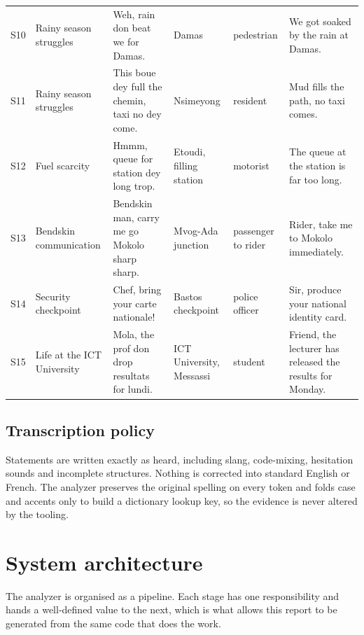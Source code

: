 \documentclass[11pt,a4paper]{article}
\begin{document}
\begin{longtable}{L{0.045} L{0.13} L{0.25} L{0.13} L{0.12} L{0.19}}
S10 & Rainy season struggles & Weh, rain don beat we for Damas. & Damas & pedestrian & We got soaked by the rain at Damas. \\
S11 & Rainy season struggles & This boue dey full the chemin, taxi no dey come. & Nsimeyong & resident & Mud fills the path, no taxi comes. \\
S12 & Fuel scarcity & Hmmm, queue for station dey long trop. & Etoudi, filling station & motorist & The queue at the station is far too long. \\
S13 & Bendskin communication & Bendskin man, carry me go Mokolo sharp sharp. & Mvog-Ada junction & passenger to rider & Rider, take me to Mokolo immediately. \\
S14 & Security checkpoint & Chef, bring your carte nationale! & Bastos checkpoint & police officer & Sir, produce your national identity card. \\
S15 & Life at the ICT University & Mola, the prof don drop resultats for lundi. & ICT University, Messassi & student & Friend, the lecturer has released the results for Monday. \\
\end{longtable}
\endgroup

\subsection{Transcription policy}
Statements are written exactly as heard, including slang, code-mixing, hesitation sounds and incomplete structures. Nothing is corrected into standard English or French. The analyzer preserves the original spelling on every token and folds case and accents only to build a dictionary lookup key, so the evidence is never altered by the tooling.

\section{System architecture}
\label{sec:system-architecture}
The analyzer is organised as a pipeline. Each stage has one responsibility and hands a well-defined value to the next, which is what allows this report to be generated from the same code that does the work.
\end{document}
